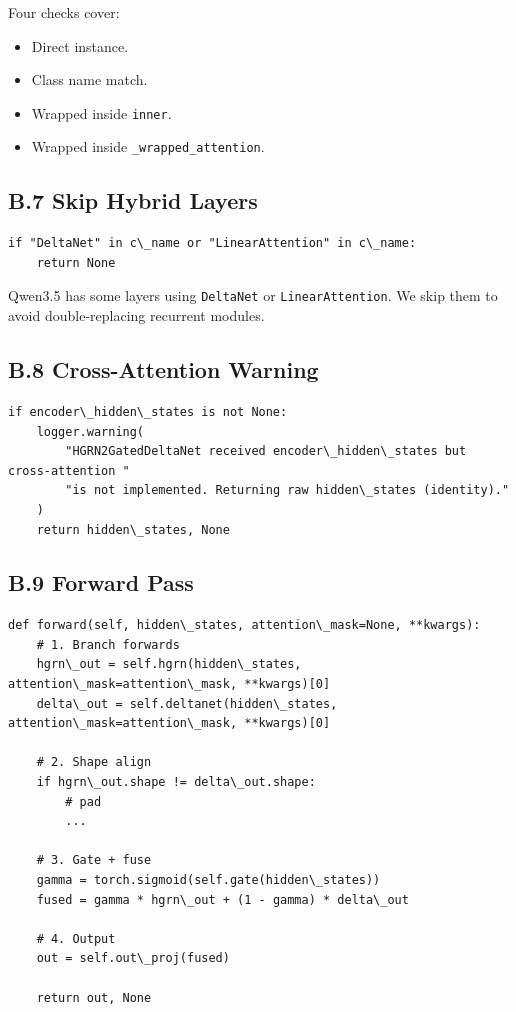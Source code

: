 Four checks cover:
\begin{itemize}
\item Direct instance.
\item Class name match.
\item Wrapped inside \texttt{inner}.
\item Wrapped inside \texttt{\_wrapped\_attention}.

\end{itemize}
\subsection{B.7 Skip Hybrid Layers}

\begin{lstlisting}
if "DeltaNet" in c\_name or "LinearAttention" in c\_name:
    return None
\end{lstlisting}

Qwen3.5 has some layers using \texttt{DeltaNet} or \texttt{LinearAttention}. We skip them 
to avoid double-replacing recurrent modules.

\subsection{B.8 Cross-Attention Warning}

\begin{lstlisting}
if encoder\_hidden\_states is not None:
    logger.warning(
        "HGRN2GatedDeltaNet received encoder\_hidden\_states but cross-attention "
        "is not implemented. Returning raw hidden\_states (identity)."
    )
    return hidden\_states, None
\end{lstlisting}

\subsection{B.9 Forward Pass}

\begin{lstlisting}
def forward(self, hidden\_states, attention\_mask=None, **kwargs):
    # 1. Branch forwards
    hgrn\_out = self.hgrn(hidden\_states, attention\_mask=attention\_mask, **kwargs)[0]
    delta\_out = self.deltanet(hidden\_states, attention\_mask=attention\_mask, **kwargs)[0]
    
    # 2. Shape align
    if hgrn\_out.shape != delta\_out.shape:
        # pad
        ...
    
    # 3. Gate + fuse
    gamma = torch.sigmoid(self.gate(hidden\_states))
    fused = gamma * hgrn\_out + (1 - gamma) * delta\_out
    
    # 4. Output
    out = self.out\_proj(fused)
    
    return out, None
\end{lstlisting}

